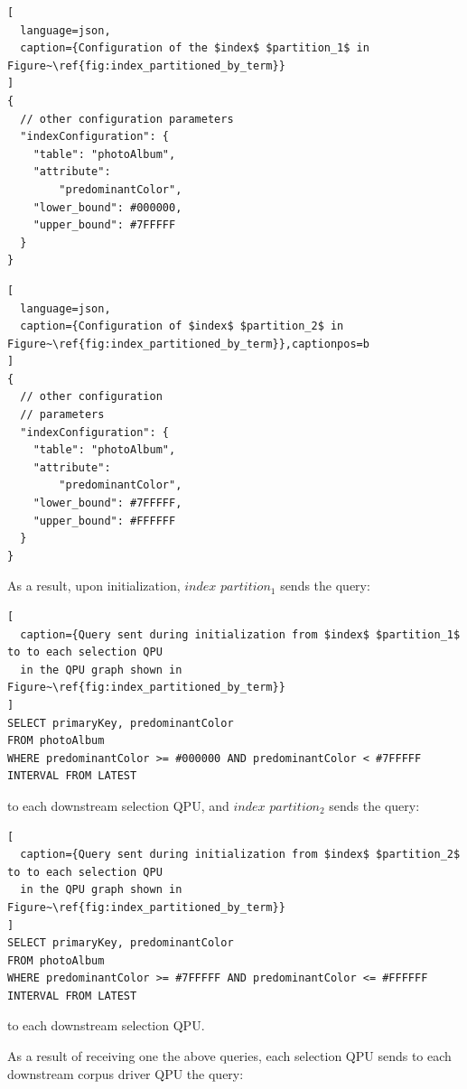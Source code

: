 \begin{minipage}{.45\textwidth}
\begin{lstlisting}[
  language=json,
  caption={Configuration of the $index$ $partition_1$ in Figure~\ref{fig:index_partitioned_by_term}}
]
{
  // other configuration parameters
  "indexConfiguration": {
    "table": "photoAlbum",
    "attribute":
        "predominantColor",
    "lower_bound": #000000,
    "upper_bound": #7FFFFF
  }
}
\end{lstlisting}
\end{minipage}\hfill
\begin{minipage}{.45\textwidth}
\begin{lstlisting}[
  language=json,
  caption={Configuration of $index$ $partition_2$ in Figure~\ref{fig:index_partitioned_by_term}},captionpos=b
]
{
  // other configuration
  // parameters
  "indexConfiguration": {
    "table": "photoAlbum",
    "attribute":
        "predominantColor",
    "lower_bound": #7FFFFF,
    "upper_bound": #FFFFFF
  }
}
\end{lstlisting}
\end{minipage}

\medskip
\noindent
As a result, upon initialization, $index$ $partition_1$ sends the query:

\begin{lstlisting}[
  caption={Query sent during initialization from $index$ $partition_1$ to to each selection QPU
  in the QPU graph shown in Figure~\ref{fig:index_partitioned_by_term}}
]
SELECT primaryKey, predominantColor
FROM photoAlbum
WHERE predominantColor >= #000000 AND predominantColor < #7FFFFF
INTERVAL FROM LATEST
\end{lstlisting}

\noindent
to each downstream selection QPU, and $index$ $partition_2$ sends the query:

\begin{lstlisting}[
  caption={Query sent during initialization from $index$ $partition_2$ to to each selection QPU
  in the QPU graph shown in Figure~\ref{fig:index_partitioned_by_term}}
]
SELECT primaryKey, predominantColor
FROM photoAlbum
WHERE predominantColor >= #7FFFFF AND predominantColor <= #FFFFFF
INTERVAL FROM LATEST
\end{lstlisting}

\noindent
to each downstream selection QPU.

\noindent
As a result of receiving one the above queries,
each selection QPU sends to each downstream corpus driver QPU the query:

